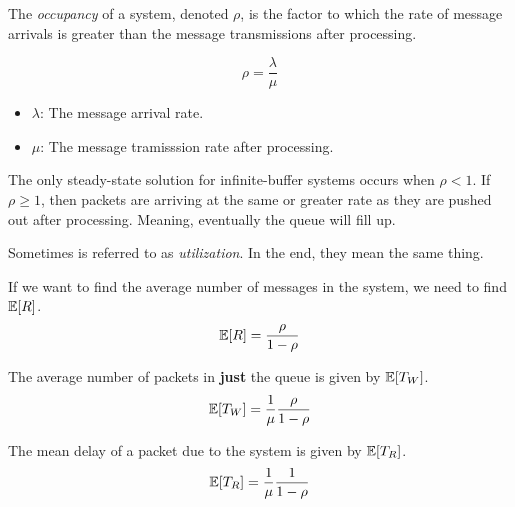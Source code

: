 \begin{definition}[Occupancy]\label{def:Occupancy}
  The \emph{occupancy} of a system, denoted $\rho$, is the factor to which the rate of message arrivals is greater than the message transmissions after processing.

  \begin{equation}\label{eq:Occupancy}
    \rho = \frac{\lambda}{\mu}
  \end{equation}
  \begin{itemize}[noitemsep]
  \item $\lambda$: The message arrival rate.
  \item $\mu$: The message tramisssion rate after processing.
  \end{itemize}

  \begin{remark}
    The only steady-state solution for infinite-buffer systems occurs when $\rho < 1$.
    If $\rho \geq 1$, then packets are arriving at the same or greater rate as they are pushed out after processing.
    Meaning, eventually the queue will fill up.
  \end{remark}

  \begin{remark}[Utilization]\label{rmk:Occupancy_Utilization}
    Sometimes  is referred to as \emph{utilization}.
    In the end, they mean the same thing.
  \end{remark}
\end{definition}

If we want to find the average number of messages in the system, we need to find $\operatorname{\operatorname{\mathbb{E}}}[R]$.
\begin{equation}\label{eq:Mean_Packets_in_Whole_System}
  \operatorname{\operatorname{\mathbb{E}}}[R] = \frac{\rho}{1-\rho}
\end{equation}

The average number of packets in \textbf{just} the queue is given by $\operatorname{\operatorname{\mathbb{E}}}[T_{W}]$.
\begin{equation}\label{eq:Mean_Packets_in_Queue}
  \operatorname{\operatorname{\mathbb{E}}}[T_{W}] = \frac{1}{\mu} \frac{\rho}{1-\rho}
\end{equation}

The mean delay of a packet due to the system is given by $\operatorname{\operatorname{\mathbb{E}}}[T_{R}]$.
\begin{equation}\label{eq:Mean_Packet_Delay}
  \operatorname{\operatorname{\mathbb{E}}}[T_{R}] = \frac{1}{\mu} \frac{1}{1-\rho}
\end{equation}


